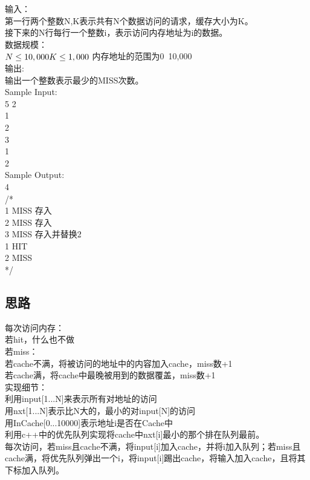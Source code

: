 \documentclass[UTF8]{ctexart}
\begin{document}
输入：\\
第一行两个整数N,K表示共有N个数据访问的请求，缓存大小为K。\\
接下来的N行每行一个整数i，表示访问内存地址为i的数据。\\

数据规模：\\
$N\leq 10,000\\
K\leq 1,000\\$
内存地址的范围为0~10,000\\


输出:\\
输出一个整数表示最少的MISS次数。\\

Sample Input:\\
5 2\\
1\\
2\\
3\\
1\\
2\\


Sample Output:\\
4\\
/*\\
1 MISS 存入\\
2 MISS 存入\\
3 MISS 存入并替换2\\
1 HIT\\
2 MISS\\
*/\\

\subsection{思路}
每次访问内存：\\
若hit，什么也不做\\
若miss：\\
若cache不满，将被访问的地址中的内容加入cache，miss数+1\\
若cache满，将cache中最晚被用到的数据覆盖，miss数+1\\

实现细节：\\
利用input[1...N]来表示所有对地址的访问\\
用nxt[1...N]表示比N大的，最小的对input[N]的访问\\
用InCache[0...10000]表示地址i是否在Cache中\\
利用c++中的优先队列实现将cache中nxt[i]最小的那个排在队列最前。\\
每次访问，若miss且cache不满，将input[i]加入cache，并将i加入队列；若miss且cache满，将优先队列弹出一个i，将input[i]踢出cache，将输入加入cache，且将其下标加入队列。
\end{document}

